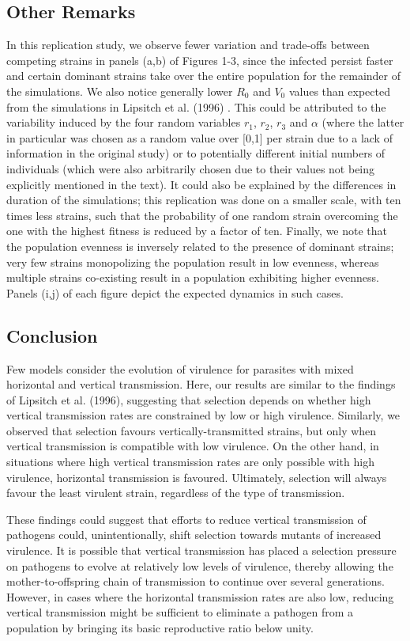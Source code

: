 \subsection{Other Remarks}
In this replication study, we observe fewer variation and trade-offs between
competing strains in panels (a,b) of Figures 1-3, since the infected persist
faster and certain dominant strains take over the entire population for the
remainder of the simulations. We also notice generally lower $R_0$ and $V_0$
values than expected from the simulations in Lipsitch et al. (1996)
\supercite{Lipsitch:1996}. This could be attributed to the variability induced
by the four random variables $r_1$, $r_2$, $r_3$ and $\alpha$ (where the latter
in particular was chosen as a random value over [0,1] per strain due to a lack
of information in the original study) or to potentially different initial
numbers of individuals (which were also arbitrarily chosen due to their values
not being explicitly mentioned in the text). It could also be explained by the
differences in duration of the simulations; this replication was done on a
smaller scale, with ten times less strains, such that the probability of one
random strain overcoming the one with the highest fitness is reduced by a
factor of ten. Finally, we note that the population evenness is inversely
related to the presence of dominant strains; very few strains monopolizing the
population result in low evenness, whereas multiple strains co-existing result
in a population exhibiting higher evenness. Panels (i,j) of each figure depict
the expected dynamics in such cases.

\subsection{Conclusion}
Few models consider the evolution of virulence for parasites with mixed
horizontal and vertical transmission. Here, our results are similar to the
findings of Lipsitch et al. (1996)\supercite{Lipsitch:1996}, suggesting that
selection depends on whether high vertical transmission rates are constrained
by low or high virulence. Similarly, we observed that selection favours
vertically-transmitted strains, but only when vertical transmission is
compatible with low virulence. On the other hand, in situations where high
vertical transmission rates are only possible with high virulence, horizontal
transmission is favoured. Ultimately, selection will always favour the least
virulent strain, regardless of the type of transmission.

These findings could suggest that efforts to reduce vertical transmission of
pathogens could, unintentionally, shift selection towards mutants of increased
virulence. It is possible that vertical transmission has placed a selection
pressure on pathogens to evolve at relatively low levels of virulence, thereby
allowing the mother-to-offspring chain of transmission to continue over several
generations. However, in cases where the horizontal transmission rates are also
low, reducing vertical transmission might be sufficient to eliminate a pathogen
from a population by bringing its basic reproductive ratio below unity.


